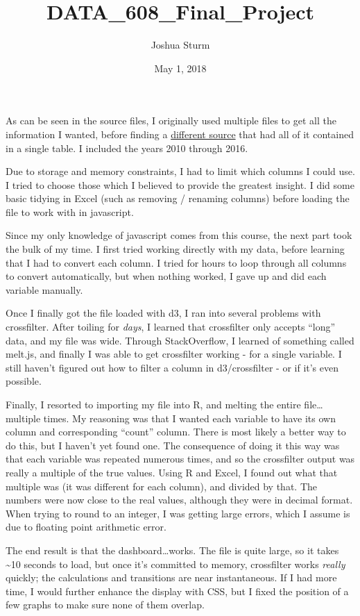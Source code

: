 \documentclass[]{article}
\title{DATA\_608\_Final\_Project}
\author{Joshua Sturm}
\date{May 1, 2018}
\begin{document}
\maketitle

As can be seen in the source files, I originally used multiple files to
get all the information I wanted, before finding a
\href{https://factfinder.census.gov/faces/tableservices/jsf/pages/productview.xhtml?pid=ACS_16_1YR_S1703\&prodType=table}{different
source} that had all of it contained in a single table. I included the
years 2010 through 2016.

Due to storage and memory constraints, I had to limit which columns I
could use. I tried to choose those which I believed to provide the
greatest insight. I did some basic tidying in Excel (such as removing /
renaming columns) before loading the file to work with in javascript.

Since my only knowledge of javascript comes from this course, the next
part took the bulk of my time. I first tried working directly with my
data, before learning that I had to convert each column. I tried for
hours to loop through all columns to convert automatically, but when
nothing worked, I gave up and did each variable manually.

Once I finally got the file loaded with d3, I ran into several problems
with crossfilter. After toiling for \emph{days}, I learned that
crossfilter only accepts ``long'' data, and my file was wide. Through
StackOverflow, I learned of something called melt.js, and finally I was
able to get crossfilter working - for a single variable. I still haven't
figured out how to filter a column in d3/crossfilter - or if it's even
possible.

Finally, I resorted to importing my file into R, and melting the entire
file\ldots{}multiple times. My reasoning was that I wanted each variable
to have its own column and corresponding ``count'' column. There is most
likely a better way to do this, but I haven't yet found one. The
consequence of doing it this way was that each variable was repeated
numerous times, and so the crossfilter output was really a multiple of
the true values. Using R and Excel, I found out what that multiple was
(it was different for each column), and divided by that. The numbers
were now close to the real values, although they were in decimal format.
When trying to round to an integer, I was getting large errors, which I
assume is due to floating point arithmetic error.

The end result is that the dashboard\ldots{}works. The file is quite
large, so it takes \textasciitilde{}10 seconds to load, but once it's
committed to memory, crossfilter works \emph{really} quickly; the
calculations and transitions are near instantaneous. If I had more time,
I would further enhance the display with CSS, but I fixed the position
of a few graphs to make sure none of them overlap.
\end{document}
